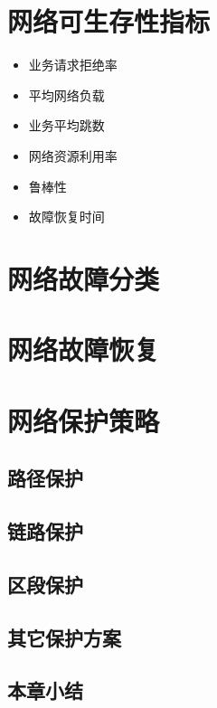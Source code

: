 \section{网络可生存性指标}
\begin{itemize}
  \item 业务请求拒绝率
  \item 平均网络负载
  \item 业务平均跳数
  \item 网络资源利用率
  \item 鲁棒性
  \item 故障恢复时间
\end{itemize}

\section{网络故障分类}

\section{网络故障恢复}
\section{网络保护策略}
\subsection{路径保护}
\subsection{链路保护}
\subsection{区段保护}
\subsection{其它保护方案}
\subsection{本章小结}


